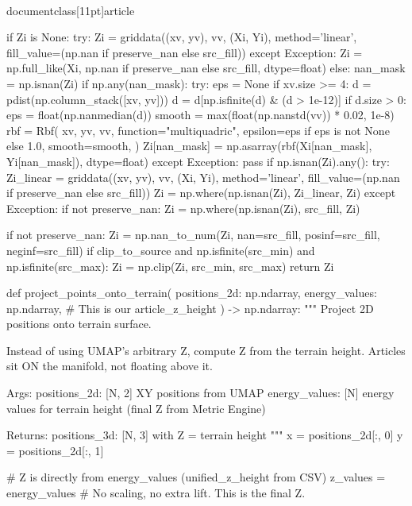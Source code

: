 \\documentclass[11pt]{article}
\begin{document}
\begin{CodeBlock}
    if Zi is None:
        try:
            Zi = griddata((xv, yv), vv, (Xi, Yi), method='linear', fill_value=(np.nan if preserve_nan else src_fill))
        except Exception:
            Zi = np.full_like(Xi, np.nan if preserve_nan else src_fill, dtype=float)
    else:
        nan_mask = np.isnan(Zi)
        if np.any(nan_mask):
            try:
                eps = None
                if xv.size >= 4:
                    d = pdist(np.column_stack([xv, yv]))
                    d = d[np.isfinite(d) & (d > 1e-12)]
                    if d.size > 0:
                        eps = float(np.nanmedian(d))
                smooth = max(float(np.nanstd(vv)) * 0.02, 1e-8)
                rbf = Rbf(
                    xv,
                    yv,
                    vv,
                    function="multiquadric",
                    epsilon=eps if eps is not None else 1.0,
                    smooth=smooth,
                )
                Zi[nan_mask] = np.asarray(rbf(Xi[nan_mask], Yi[nan_mask]), dtype=float)
            except Exception:
                pass
            if np.isnan(Zi).any():
                try:
                    Zi_linear = griddata((xv, yv), vv, (Xi, Yi), method='linear', fill_value=(np.nan if preserve_nan else src_fill))
                    Zi = np.where(np.isnan(Zi), Zi_linear, Zi)
                except Exception:
                    if not preserve_nan:
                        Zi = np.where(np.isnan(Zi), src_fill, Zi)

    if not preserve_nan:
        Zi = np.nan_to_num(Zi, nan=src_fill, posinf=src_fill, neginf=src_fill)
    if clip_to_source and np.isfinite(src_min) and np.isfinite(src_max):
        Zi = np.clip(Zi, src_min, src_max)
    return Zi


def project_points_onto_terrain(
    positions_2d: np.ndarray,
    energy_values: np.ndarray, # This is our article_z_height
) -> np.ndarray:
    """
    Project 2D positions onto terrain surface.

    Instead of using UMAP's arbitrary Z, compute Z from the terrain height.
    Articles sit ON the manifold, not floating above it.

    Args:
        positions_2d: [N, 2] XY positions from UMAP
        energy_values: [N] energy values for terrain height (final Z from Metric Engine)

    Returns:
        positions_3d: [N, 3] with Z = terrain height
    """
    x = positions_2d[:, 0]
    y = positions_2d[:, 1]

    # Z is directly from energy_values (unified_z_height from CSV)
    z_values = energy_values # No scaling, no extra lift. This is the final Z.


\end{CodeBlock}
\end{document}
